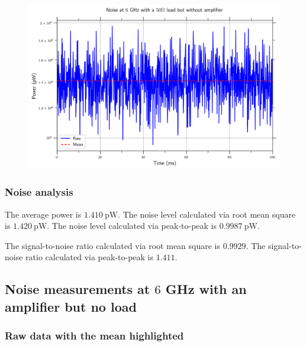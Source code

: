 \documentclass[english,12pt,a4paper]{article}
\begin{document}
\begin{figure}[H]
	\includegraphics[width=1\linewidth]{Plots/noise_floor_6_GHz_50ohm}
	\caption[Noise measurements at 6 GHz with a 50 Ohm load]{}
	\label{fig:noisefloor6ghz50ohm}
\end{figure}

 

\hypertarget{noise-analysis}{%
	\subsubsection{Noise analysis}\label{noise-analysis_2}}

	The average power is $\qty{1.410}{\pico\watt}$.
	The noise level calculated via root mean square is $\qty{1.420}{\pico\watt}$.
	The noise level calculated via peak-to-peak is $\qty{0.9987}{\pico\watt}$.
	
	The signal-to-noise ratio calculated via root mean square is $0.9929$.
	The signal-to-noise ratio calculated via peak-to-peak is $1.411$.

\hypertarget{noise-measurements-at-6-ghz-with-an-amplifier-but-no-load}{%
	\subsection{\texorpdfstring{Noise measurements at \(6\) GHz with an
			amplifier but no
			load}{Noise measurements at 6 GHz with an amplifier but no load}}\label{noise-measurements-at-6-ghz-with-an-amplifier-but-no-load}}


\hypertarget{raw-data-with-the-mean-highlighted}{%
	\subsubsection{Raw data with the mean
		highlighted}\label{raw-data-with-the-mean-highlighted_2}}
\end{document}

